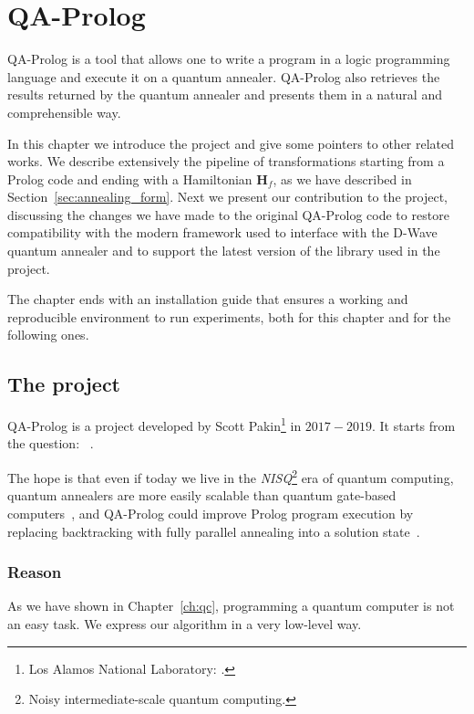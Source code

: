 \chapter{QA-Prolog}
\label{ch:qa_p}
QA-Prolog is a tool that allows one to write a program in a logic programming language and execute it on a quantum annealer. QA-Prolog also retrieves the results returned by the quantum annealer and presents them in a natural and comprehensible way.

In this chapter we introduce the project and give some pointers to other related works. We describe extensively the pipeline of transformations starting from a Prolog code and ending with a Hamiltonian $\mathbf{H}_f$, as we have described in Section~\ref{sec:annealing_form}. Next we present our contribution to the project, discussing the changes we have made to the original QA-Prolog code to restore compatibility with the modern framework used to interface with the D-Wave quantum annealer and to support the latest version of the library used in the project.

The chapter ends with an installation guide that ensures a working and reproducible environment to run experiments, both for this chapter and for the following ones.

\section{The project}
QA-Prolog is a project developed by Scott Pakin\footnote{Los Alamos National Laboratory: .} in $2017-2019$. It starts from the question: ~\cite{pakin2018performing}. 

The hope is that even if today we live in the \emph{NISQ}\footnote{Noisy intermediate-scale quantum computing.} era of quantum computing, quantum annealers are more easily scalable than quantum gate-based computers~\cite{kaminsky2004scalable}, and QA-Prolog could improve Prolog program execution by replacing backtracking with fully parallel annealing into a solution state~\cite{lanl_QA_Prolog}.

\subsection{Reason}
As we have shown in Chapter~\ref{ch:qc}, programming a quantum computer is not an easy task. We express our algorithm in a very low-level way.

